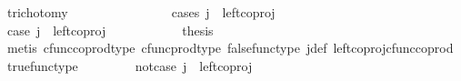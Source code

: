 \begin{isabellebody}
\ trichotomy{\isacharcolon}{\kern0pt}\ {\isachardoublequoteopen}{\isacharparenleft}{\kern0pt}{\isasymlangle}{\isasymf}{\isacharcomma}{\kern0pt}{\isasymf}{\isasymrangle}\ {\isacharequal}{\kern0pt}\ {\isasymlangle}{\isasymt}{\isacharcomma}{\kern0pt}{\isasymt}{\isasymrangle}{\isacharparenright}{\kern0pt}\ {\isasymor}\ {\isacharparenleft}{\kern0pt}{\isasymlangle}{\isasymt}{\isacharcomma}{\kern0pt}\ {\isasymf}{\isasymrangle}\ {\isacharequal}{\kern0pt}\ {\isasymlangle}{\isasymt}{\isacharcomma}{\kern0pt}{\isasymt}{\isasymrangle}{\isacharparenright}{\kern0pt}\ {\isasymor}\ {\isacharparenleft}{\kern0pt}{\isasymlangle}{\isasymf}{\isacharcomma}{\kern0pt}\ {\isasymt}{\isasymrangle}\ {\isacharequal}{\kern0pt}\ {\isasymlangle}{\isasymt}{\isacharcomma}{\kern0pt}{\isasymt}{\isasymrangle}{\isacharparenright}{\kern0pt}{\isachardoublequoteclose}\isanewline
\ \ \isamarkupfalse%
{\isacharparenleft}{\kern0pt}cases\ {\isachardoublequoteopen}j\ {\isacharequal}{\kern0pt}\ left{\isacharunderscore}{\kern0pt}coproj\ {\isasymone}\ {\isacharparenleft}{\kern0pt}{\isasymone}\ {\isasymCoprod}\ {\isasymone}{\isacharparenright}{\kern0pt}{\isachardoublequoteclose}{\isacharparenright}{\kern0pt}\isanewline
\ \ \ \ \isamarkupfalse%
\ case{}{\isacharcolon}{\kern0pt}\ {\isachardoublequoteopen}j\ {\isacharequal}{\kern0pt}\ left{\isacharunderscore}{\kern0pt}coproj\ {\isasymone}\ {\isacharparenleft}{\kern0pt}{\isasymone}\ {\isasymCoprod}\ {\isasymone}{\isacharparenright}{\kern0pt}{\isachardoublequoteclose}\isanewline
\ \ \ \ \isamarkupfalse%
\ \isamarkupfalse%
\ {\isacharquery}{\kern0pt}thesis\isanewline
\ \ \ \ \ \ \isamarkupfalse%
\ {\isacharparenleft}{\kern0pt}metis\ cfunc{\isacharunderscore}{\kern0pt}coprod{\isacharunderscore}{\kern0pt}type\ cfunc{\isacharunderscore}{\kern0pt}prod{\isacharunderscore}{\kern0pt}type\ false{\isacharunderscore}{\kern0pt}func{\isacharunderscore}{\kern0pt}type\ j{\isacharunderscore}{\kern0pt}def\ left{\isacharunderscore}{\kern0pt}coproj{\isacharunderscore}{\kern0pt}cfunc{\isacharunderscore}{\kern0pt}coprod\ true{\isacharunderscore}{\kern0pt}func{\isacharunderscore}{\kern0pt}type{\isacharparenright}{\kern0pt}\isanewline
\ \ \isamarkupfalse%
\isanewline
\ \ \ \ \isamarkupfalse%
\ not{\isacharunderscore}{\kern0pt}case{}{\isacharcolon}{\kern0pt}\ {\isachardoublequoteopen}j\ {\isasymnoteq}\ left{\isacharunderscore}{\kern0pt}coproj\ {\isasymone}\ {\isacharparenleft}{\kern0pt}{\isasymone}\ {\isasymCoprod}\ {\isasymone}{\isacharparenright}{\kern0pt}{\isachardoublequoteclose}\isanewline

\end{isabellebody}
